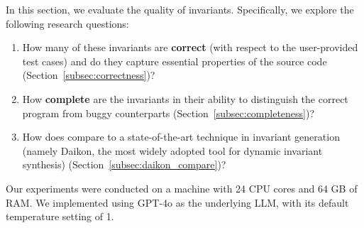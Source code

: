 


In this section, we evaluate the quality of \tech invariants. 
Specifically, we explore the following research questions:
\begin{enumerate}
    \item How many of these invariants are \textbf{correct} (with respect to the user-provided test cases) and do they capture essential properties of the source code (Section~\ref{subsec:correctness})?
    \item How \textbf{complete} are the invariants in their ability to distinguish the correct program from buggy counterparts (Section~\ref{subsec:completeness})? 
    \item How does \tech compare to a state-of-the-art technique in invariant generation (namely Daikon, the most widely adopted tool for dynamic invariant synthesis) (Section~\ref{subsec:daikon_compare})?
\end{enumerate}


Our experiments were conducted on a machine with 24 CPU cores and 64 GB of RAM. We implemented \tech using GPT-4o as the underlying LLM, with its default temperature setting of 1.
